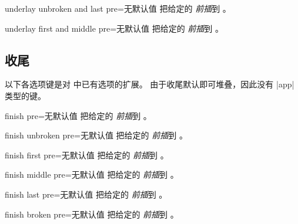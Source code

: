 \begin{docTcbKey}{underlay unbroken and last pre}{=}{无默认值}
  把给定的  \emph{前插}到 。
\end{docTcbKey}

\begin{docTcbKey}[][doc new=2014-09-19]{underlay first and middle pre}{=}{无默认值}
  把给定的  \emph{前插}到 。
\end{docTcbKey}


\clearpage
\subsection{收尾}
以下各选项键是对  中已有选项的扩展。
由于收尾默认即可堆叠，因此没有 |app| 类型的键。

\begin{docTcbKey}{finish pre}{=}{无默认值}
  把给定的  \emph{前插}到 。
\end{docTcbKey}

\begin{docTcbKey}{finish unbroken pre}{=}{无默认值}
  把给定的  \emph{前插}到 。
\end{docTcbKey}

\begin{docTcbKey}{finish first pre}{=}{无默认值}
  把给定的  \emph{前插}到 。
\end{docTcbKey}

\begin{docTcbKey}{finish middle pre}{=}{无默认值}
  把给定的  \emph{前插}到 。
\end{docTcbKey}

\begin{docTcbKey}{finish last pre}{=}{无默认值}
  把给定的  \emph{前插}到 。
\end{docTcbKey}

\begin{docTcbKey}{finish broken pre}{=}{无默认值}
  把给定的  \emph{前插}到 。
\end{docTcbKey}

